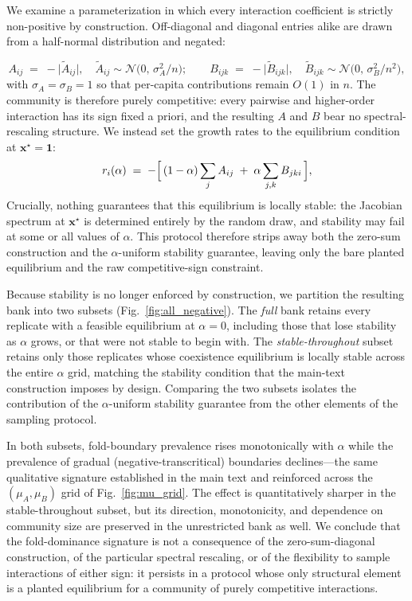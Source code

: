 \documentclass[pdflatex,sn-mathphys-num]{sn-jnl}%
\newcommand{\bone}{\mathbf{1}}
\newcommand{\bx}{\mathbf{x}}
\begin{document}
We examine a parameterization in which every interaction coefficient is strictly non-positive by construction. Off-diagonal and diagonal entries alike are drawn from a half-normal distribution and negated:

\begin{equation}\label{eq:all_neg}
A_{ij} \;=\; -\bigl|\tilde{A}_{ij}\bigr|, \quad \tilde{A}_{ij} \sim \mathcal{N}\!\bigl(0,\,\sigma_A^2/n\bigr);
\qquad
B_{ijk} \;=\; -\bigl|\tilde{B}_{ijk}\bigr|, \quad \tilde{B}_{ijk} \sim \mathcal{N}\!\bigl(0,\,\sigma_B^2/n^2\bigr),
\end{equation}
with $\sigma_A = \sigma_B = 1$ so that per-capita contributions remain $O(1)$ in $n$. The community is therefore purely competitive: every pairwise and higher-order interaction has its sign fixed a priori, and the resulting $A$ and $B$ bear no spectral-rescaling structure. We instead set the growth rates to the equilibrium condition at $\bx^\star = \bone$:
\begin{equation}\label{eq:all_neg_r}
r_i(\alpha) \;=\; -\Bigl[\,(1-\alpha)\sum_j A_{ij} \;+\; \alpha \sum_{j,k} B_{jki}\,\Bigr],
\end{equation}
Crucially, nothing guarantees that this equilibrium is locally stable: the Jacobian spectrum at $\bx^\star$ is determined entirely by the random draw, and stability may fail at some or all values of $\alpha$. This protocol therefore strips away both the zero-sum construction and the $\alpha$-uniform stability guarantee, leaving only the bare planted equilibrium and the raw competitive-sign constraint.

Because stability is no longer enforced by construction, we partition the resulting bank into two subsets (Fig.~\ref{fig:all_negative}). The \emph{full} bank retains every replicate with a feasible equilibrium at $\alpha = 0$, including those that lose stability as $\alpha$ grows, or that were not stable to begin with. The \emph{stable-throughout} subset retains only those replicates whose coexistence equilibrium is locally stable across the entire $\alpha$ grid, matching the stability condition that the main-text construction imposes by design. Comparing the two subsets isolates the contribution of the $\alpha$-uniform stability guarantee from the other elements of the sampling protocol.

In both subsets, fold-boundary prevalence rises monotonically with $\alpha$ while the prevalence of gradual (negative-transcritical) boundaries declines---the same qualitative signature established in the main text and reinforced across the $(\mu_A, \mu_B)$ grid of Fig.~\ref{fig:mu_grid}. The effect is quantitatively sharper in the stable-throughout subset, but its direction, monotonicity, and dependence on community size are preserved in the unrestricted bank as well. We conclude that the fold-dominance signature is not a consequence of the zero-sum-diagonal construction, of the particular spectral rescaling, or of the flexibility to sample interactions of either sign: it persists in a protocol whose only structural element is a planted equilibrium for a community of purely competitive interactions.
\end{document}
